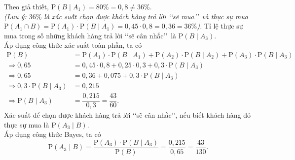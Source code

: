 \begin{ex}
{\begin{itemchoice}
			Theo giả thiết, $\mathrm{P}(B\mid A_1) = 80\% = 0{,}8 \ne 36\%$.\\
			\textit{(Lưu ý: $36\%$ là xác suất chọn được khách hàng trả lời \lq\lq sẽ mua\rq\rq\ và thực sự mua $\mathrm{P}(A_1 \cap B) = \mathrm{P}(A_1) \cdot \mathrm{P}(B \mid A_1) = 0{,}45 \cdot 0{,}8 = 0{,}36 = 36\%$).}
			\itemch Tỉ lệ thực sự mua trong số những khách hàng trả lời \lq\lq sẽ cân nhắc\rq\rq\ là $\mathrm{P}(B\mid A_3)$.\\
			Áp dụng công thức xác suất toàn phần, ta có
			\allowdisplaybreaks
			\begin{align*}
				\mathrm{P}(B) &= \mathrm{P}(A_1) \cdot \mathrm{P}(B\mid A_1) + \mathrm{P}(A_2) \cdot \mathrm{P}(B\mid A_2) + \mathrm{P}(A_3) \cdot \mathrm{P}(B\mid A_3)\\
				\Rightarrow 0{,}65 &= 0{,}45 \cdot 0{,}8 + 0{,}25 \cdot 0{,}3 + 0{,}3 \cdot \mathrm{P}(B\mid A_3)\\
				\Rightarrow 0{,}65 &= 0{,}36 + 0{,}075 + 0{,}3 \cdot \mathrm{P}(B\mid A_3)\\
				\Rightarrow 0{,}3 \cdot \mathrm{P}(B\mid A_3) &= 0{,}215\\
				\Rightarrow \mathrm{P}(B\mid A_3) &= \dfrac{0{,}215}{0{,}3} = \dfrac{43}{60}.
			\end{align*}
			\itemch Xác suất để chọn được khách hàng trả lời \lq\lq sẽ cân nhắc\rq\rq, nếu biết khách hàng đó thực sự mua là $\mathrm{P}(A_3\mid B)$.\\
			Áp dụng công thức Bayes, ta có
			\[
			\mathrm{P}(A_3\mid B) = \dfrac{\mathrm{P}(A_3) \cdot \mathrm{P}(B\mid A_3)}{\mathrm{P}(B)}
			=\dfrac{0{,}215}{0{,}65} = \dfrac{43}{130}.
			\]
		\end{itemchoice}
	}
\end{ex}



